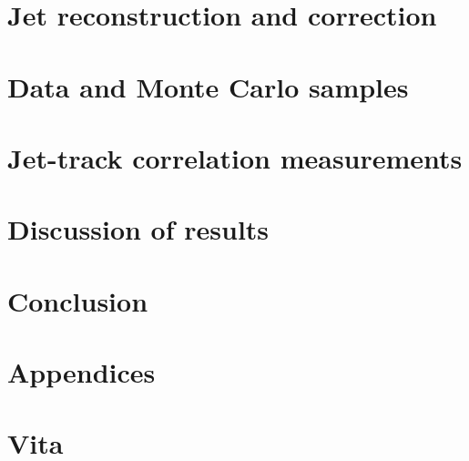 \documentclass[11pt]{article}
\begin{document}
\section{Jet reconstruction and correction}
\label{sec:Jets}

\clearpage

\section{Data and Monte Carlo samples}
\label{sec:Samples}

\clearpage


\section{Jet-track correlation measurements}
\label{sec:JetTrack}

\clearpage

\section{Discussion of results}
\label{sec:Results}

\clearpage

\section{Conclusion}
\label{sec:Conclusion}

\clearpage




\clearpage


\appendix

\appendix
\section*{Appendices}
\renewcommand{\thesubsection}{\Alph{subsection}}


\clearpage

\section*{Vita}

\end{document}
